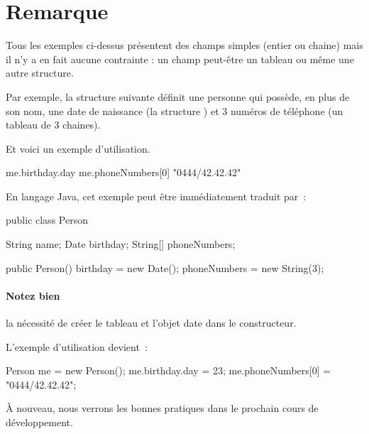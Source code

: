 	\section{Remarque}
	
		Tous les exemples ci-dessus présentent des champs simples (entier ou
		chaine) mais il n'y a en fait aucune contrainte : un champ peut-être un
		tableau ou même une autre structure.
		
		Par exemple, la structure suivante définit une personne qui possède, en
		plus de son nom, une date de naissance (la structure ) et
		3 numéros de téléphone (un tableau de 3 chaines).
		
		\begin{pseudocode}
			\EndStruct
		\end{pseudocode}

		Et voici un exemple d'utilisation.

		\begin{pseudocode}
			\Decl{me}{Person}
			\Let me.birthday.day \Gets 23
			\Let me.phoneNumbers[0] \Gets "0444/42.42.42"
		\end{pseudocode}
		
		En langage Java, cet exemple peut être immédiatement traduit par~:

		\begin{java}
public class Person{
	String name;
	Date birthday;
	String[] phoneNumbers;

	public Person(){
		birthday = new Date();
		phoneNumbers = new String(3);
	}
}
		\end{java}

		\paragraph{Notez bien} la nécessité de créer le tableau et l'objet date
		dans le constructeur. 

		L'exemple d'utilisation devient~:

		\begin{java}
Person me = new Person();
me.birthday.day = 23;
me.phoneNumbers[0] = "0444/42.42.42";
		\end{java}

		À nouveau, nous verrons les bonnes pratiques dans le prochain cours de 
		développement. 
	
